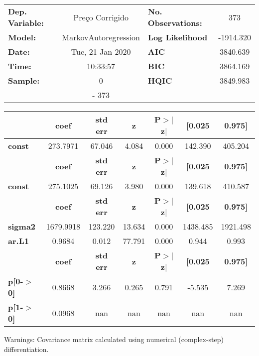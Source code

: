 \begin{center}
\begin{tabular}{lclc}
\toprule
\textbf{Dep. Variable:} &   Preço Corrigido    & \textbf{  No. Observations:  } &    373      \\
\textbf{Model:}         & MarkovAutoregression & \textbf{  Log Likelihood     } & -1914.320   \\
\textbf{Date:}          &   Tue, 21 Jan 2020   & \textbf{  AIC                } &  3840.639   \\
\textbf{Time:}          &       10:33:57       & \textbf{  BIC                } &  3864.169   \\
\textbf{Sample:}        &          0           & \textbf{  HQIC               } &  3849.983   \\
\textbf{}               &         - 373        & \textbf{                     } &             \\
\bottomrule
\end{tabular}
\begin{tabular}{lcccccc}
               & \textbf{coef} & \textbf{std err} & \textbf{z} & \textbf{P$>$$|$z$|$} & \textbf{[0.025} & \textbf{0.975]}  \\
\midrule
\textbf{const} &     273.7971  &       67.046     &     4.084  &         0.000        &      142.390    &      405.204     \\
               & \textbf{coef} & \textbf{std err} & \textbf{z} & \textbf{P$>$$|$z$|$} & \textbf{[0.025} & \textbf{0.975]}  \\
\midrule
\textbf{const} &     275.1025  &       69.126     &     3.980  &         0.000        &      139.618    &      410.587     \\
                & \textbf{coef} & \textbf{std err} & \textbf{z} & \textbf{P$>$$|$z$|$} & \textbf{[0.025} & \textbf{0.975]}  \\
\midrule
\textbf{sigma2} &    1679.9918  &      123.220     &    13.634  &         0.000        &     1438.485    &     1921.498     \\
\textbf{ar.L1}  &       0.9684  &        0.012     &    77.791  &         0.000        &        0.944    &        0.993     \\
                   & \textbf{coef} & \textbf{std err} & \textbf{z} & \textbf{P$>$$|$z$|$} & \textbf{[0.025} & \textbf{0.975]}  \\
\midrule
\textbf{p[0-$>$0]} &       0.8668  &        3.266     &     0.265  &         0.791        &       -5.535    &        7.269     \\
\textbf{p[1-$>$0]} &       0.0968  &          nan     &       nan  &           nan        &          nan    &          nan     \\
\bottomrule
\end{tabular}
\end{center}

Warnings: \newline
 [1] Covariance matrix calculated using numerical (complex-step) differentiation.